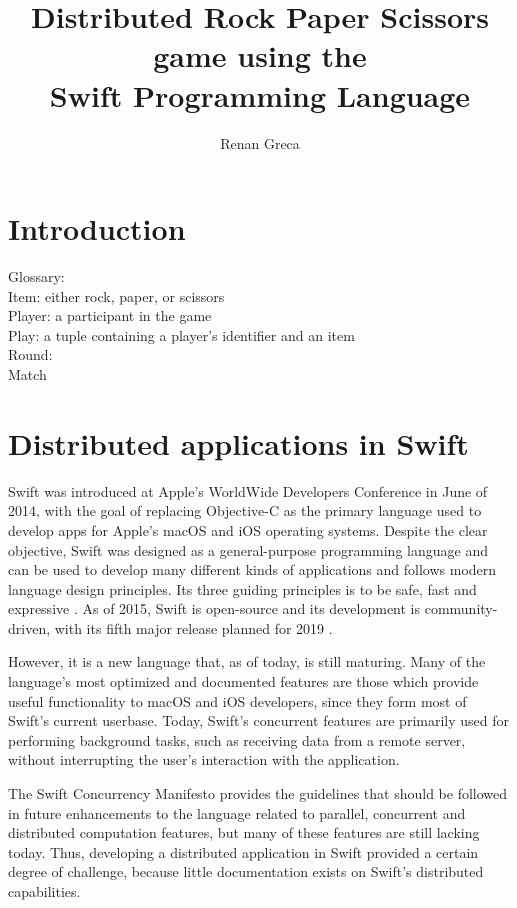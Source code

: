 \documentclass[11pt]{article}
\begin{document}
\title{Distributed Rock Paper Scissors game using the\\Swift Programming Language}
\author{Renan Greca}
\maketitle

\begin{abstract}
	
\end{abstract}

\section{Introduction}

Glossary:\\
Item: either rock, paper, or scissors\\
Player: a participant in the game\\
Play: a tuple containing a player's identifier and an item\\
Round: \\
Match

\section{Distributed applications in Swift}
Swift was introduced at Apple's WorldWide Developers Conference in June of 2014, with the goal of replacing Objective-C as the primary language used to develop apps for Apple's macOS and iOS operating systems.
Despite the clear objective, Swift was designed as a general-purpose programming language and can be used to develop many different kinds of applications and follows modern language design principles.
Its three guiding principles is to be safe, fast and expressive \cite{swift}.
As of 2015, Swift is open-source and its development is community-driven, with its fifth major release planned for 2019 \cite{swiftevolution}.

However, it is a new language that, as of today, is still maturing.
Many of the language's most optimized and documented features are those which provide useful functionality to macOS and iOS developers, since they form most of Swift's current userbase.
Today, Swift's concurrent features are primarily used for performing background tasks, such as receiving data from a remote server, without interrupting the user's interaction with the application.

The Swift Concurrency Manifesto \cite{swiftconcurrency2017} provides the guidelines that should be followed in future enhancements to the language related to parallel, concurrent and distributed computation features, but many of these features are still lacking today.
Thus, developing a distributed application in Swift provided a certain degree of challenge, because little documentation exists on Swift's distributed capabilities.
\end{document}

